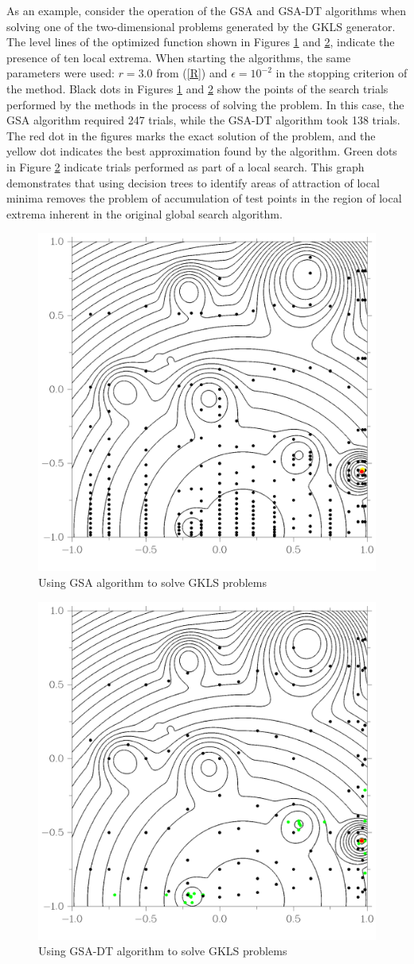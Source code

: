 \documentclass[entropy,article,submit,moreauthors,pdftex]{Definitions/mdpi}
\begin{document}
As an example, consider the operation of the GSA and GSA-DT algorithms when solving one of the two-dimensional problems generated by the GKLS generator. 
The level lines of the optimized function shown in Figures \ref{fig3} and \ref{fig4}, indicate the presence of ten local extrema. 
When starting the algorithms, the same parameters were used:  $r=3.0$ from (\ref{R}) and $\epsilon = 10^{-2}$ in the stopping criterion of the method. 
Black dots in Figures \ref{fig3} and \ref{fig4} show the points of the search trials performed by the methods in the process of solving the problem. In this case, the GSA algorithm required 247 trials, while the GSA-DT algorithm took 138 trials.
The red dot in the figures marks the exact solution of the problem, and the yellow dot indicates the best approximation found by the algorithm. 
Green dots in Figure \ref{fig4} indicate trials performed as part of a local search. 
This graph demonstrates that using decision trees to identify areas of attraction of local minima removes the problem of accumulation of test points in the region of local extrema inherent in the original global search algorithm.


\begin{figure}[H]
\includegraphics[width=0.6\linewidth]{GKLSAdaptiv6_30line.png}
\caption{Using GSA algorithm to solve GKLS problems}
\label{fig3}
\end{figure}   

\begin{figure}[H]
\includegraphics[width=0.6\linewidth]{GKLSTree6_30line.png}
\caption{Using GSA-DT algorithm to solve GKLS problems}
\label{fig4}
\end{figure}   
\end{document}
